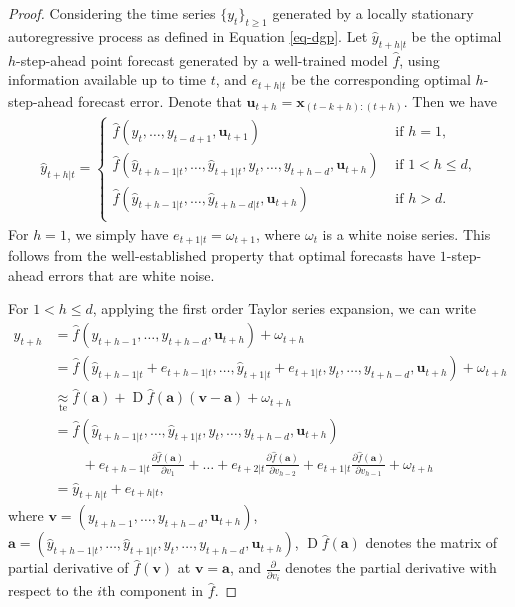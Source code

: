 \documentclass[
  11pt,
  12pt]{article}
\theoremstyle{plain}
\theoremstyle{remark}
\begin{document}
\begin{proof}
Considering the time series \(\{y_t\}_{t\geq1}\) generated by a locally
stationary autoregressive process as defined in Equation \eqref{eq-dgp}.
Let \(\hat{y}_{t+h|t}\) be the optimal \(h\)-step-ahead point forecast
generated by a well-trained model \(\hat{f}\), using information
available up to time \(t\), and \(e_{t+h|t}\) be the corresponding
optimal \(h\)-step-ahead forecast error. Denote that
\(\bm{u}_{t+h}=\bm{x}_{(t-k+h):(t+h)}\). Then we have \begin{align*}
\hat{y}_{t+h|t}=\begin{cases}
      \hat{f}(y_t,\dots,y_{t-d+1},\bm{u}_{t+1}) & \text{ if } h=1, \\
      \hat{f}(\hat{y}_{t+h-1|t},\dots,\hat{y}_{t+1|t},y_t,\dots,y_{t+h-d},\bm{u}_{t+h}) &  \text{ if } 1 < h \leq d, \\
      \hat{f}(\hat{y}_{t+h-1|t},\dots,\hat{y}_{t+h-d|t},\bm{u}_{t+h}) & \text{ if } h > d.\\
    \end{cases}
\end{align*} For \(h=1\), we simply have \(e_{t+1|t} = \omega_{t+1}\),
where \(\omega_t\) is a white noise series. This follows from the
well-established property that optimal forecasts have \(1\)-step-ahead
errors that are white noise.

For \(1<h\leq d\), applying the first order Taylor series expansion, we
can write \begin{align*}
y_{t+h}
&= \hat{f}(y_{t+h-1},\dots,y_{t+h-d},\bm{u}_{t+h})+\omega_{t+h} \\
&= \hat{f}(\hat{y}_{t+h-1|t}+e_{t+h-1|t},\dots,\hat{y}_{t+1|t}+e_{t+1|t},y_{t},\dots,y_{t+h-d},\bm{u}_{t+h})+\omega_{t+h} \\
&\underset{\text{te}}{\approx} \hat{f}(\bm{a})+\operatorname{D}\hat{f}(\bm{a})(\bm{v}-\bm{a})+
\omega_{t+h} \\
&= \hat{f}(\hat{y}_{t+h-1|t},\dots,\hat{y}_{t+1|t},y_{t},\dots,y_{t+h-d},\bm{u}_{t+h}) \\
&\mbox{}\qquad +e_{t+h-1|t}\frac{\partial \hat{f}(\bm{a})}{\partial v_1}+\dots+e_{t+2|t}\frac{\partial \hat{f}(\bm{a})}{\partial v_{h-2}}+e_{t+1|t}\frac{\partial \hat{f}(\bm{a})}{\partial v_{h-1}}+\omega_{t+h} \\
&=\hat{y}_{t+h|t}+e_{t+h|t},
\end{align*} where \(\bm{v}=(y_{t+h-1},\dots,y_{t+h-d},\bm{u}_{t+h})\),
\(\bm{a} =(\hat{y}_{t+h-1|t},\dots,\hat{y}_{t+1|t},y_{t},\dots,y_{t+h-d},\bm{u}_{t+h})\),
\(\operatorname{D}\hat{f}(\bm{a})\) denotes the matrix of partial
derivative of \(\hat{f}(\bm{v})\) at \(\bm{v}=\bm{a}\), and
\(\frac{\partial}{\partial v_i}\) denotes the partial derivative with
respect to the \(i\)th component in \(\hat{f}\).


\end{proof}
\end{document}

